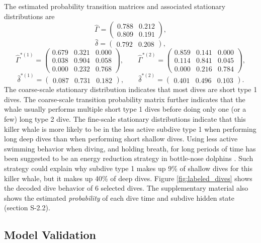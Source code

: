 The estimated probability transition matrices and associated stationary distributions are
%
$$\hat \Gamma = \begin{pmatrix} 
0.788 & 0.212 \\
0.809 & 0.191
\end{pmatrix},$$
$$\hat \delta = \begin{pmatrix} 0.792 & 0.208 \end{pmatrix},$$
%
$$\hat \Gamma^{*(1)} = \begin{pmatrix} 
0.679 & 0.321 & 0.000 \\
0.038 & 0.904 & 0.058 \\
0.000 & 0.232 & 0.768
\end{pmatrix}, \qquad 
\hat \Gamma^{*(2)} = \begin{pmatrix} 
0.859 & 0.141 & 0.000 \\
0.114 & 0.841 & 0.045 \\
0.000 & 0.216 & 0.784
\end{pmatrix},$$
$$\hat \delta^{*(1)} = \begin{pmatrix} 0.087 & 0.731 & 0.182 \end{pmatrix}, \qquad
\hat \delta^{*(2)} = \begin{pmatrix} 0.401 & 0.496 & 0.103 \end{pmatrix}.$$
%
The coarse-scale stationary distribution indicates that most dives are short type 1 dives. The coarse-scale transition probability matrix further indicates that the whale usually performs multiple short type 1 dives before doing only one (or a few) long type 2 dive. The fine-scale stationary distributions indicate that this killer whale is more likely to be in the less active subdive type 1 when performing long deep dives than when performing short shallow dives. Using less active swimming behavior when diving, and holding breath, for long periods of time has been suggested to be an energy reduction strategy in bottle-nose dolphins \citep{Williams:1999}. Such strategy could explain why subdive type 1 makes up 9\% of shallow dives for this killer whale, but it makes up 40\% of deep dives. Figure \ref{fig:labeled_dives} shows the decoded dive behavior of 6 selected dives. The supplementary material also shows the estimated \textit{probability} of each dive time and subdive hidden state (section S-2.2).

\subsection{Model Validation}
\label{subsec:model_validation}

